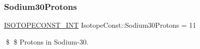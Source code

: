 \subsubsection{\texorpdfstring{Sodium30\+Protons}{Sodium30Protons}}
{\footnotesize\ttfamily \mbox{\hyperlink{group___isotope_const-_macros_ga5f18360b3e99483a35c32d789e62621c}{I\+S\+O\+T\+O\+P\+E\+C\+O\+N\+S\+T\+\_\+\+I\+NT}} Isotope\+Const\+::\+Sodium30\+Protons = 11}

\$ \$ Protons in Sodium-\/30. 